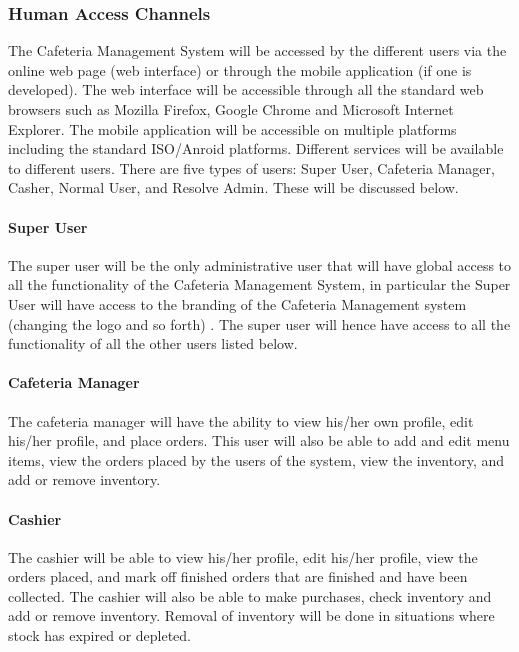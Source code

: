 \documentclass[12pt]{article}
\begin{document}
\subsubsection{Human Access Channels}
The Cafeteria Management System will be accessed by the different users via the online web page (web interface) or through the mobile application (if one is developed). The web interface will be accessible through all the standard web browsers such as Mozilla Firefox, Google Chrome and Microsoft Internet Explorer. The mobile application will be accessible on multiple platforms including the standard ISO/Anroid platforms. Different services will be available to different users. There are five types of users: Super User, Cafeteria Manager, Casher, Normal User, and Resolve Admin. These will be discussed below. \\

\paragraph{Super User\\}
The super user will be the only administrative user that will have global access to all the functionality of the Cafeteria Management System, in particular the Super User will have access to the branding of the Cafeteria Management system (changing the logo and so forth) . The super user will hence have access to all the functionality of all the other users listed below.

\paragraph{ Cafeteria Manager\\}
The cafeteria manager will have the ability to view his/her own profile, edit his/her profile, and place orders. This user will also be able to add and edit menu items, view the orders placed by the users of the system, view the inventory, and add or remove inventory. 

\paragraph{ Cashier\\}
The cashier will be able to view his/her profile, edit his/her profile, view the orders placed, and mark off finished orders that are finished and have been collected. The cashier will also be able to make purchases, check inventory and add or remove inventory. Removal of inventory will be done in situations where stock has expired or depleted.
\end{document}
